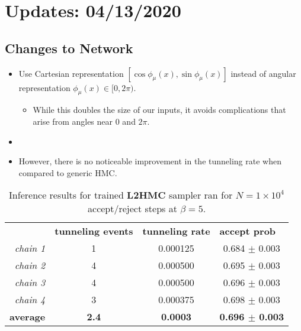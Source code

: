 \section{Updates: 04/13/2020}%
\label{sec:updates_2020_04_13}
%
\subsection{Changes to Network}%
\label{subsec:changes_to_network}
%
\begin{itemize}
  \item Use Cartesian representation \(\left[{\cos\phi_\mu(x),
    \sin\phi_\mu(x)}\right]\) instead of angular representation \(\phi_{\mu}(x)
    \in [{0, 2\pi})\).
    \begin{itemize}
      \item While this doubles the size of our inputs, it avoids complications
        that arise from angles near \(0\) and \(2\pi\).
    \end{itemize}
  \item \color{blue}{Under this new representation, the bias in the average
    plaquette no longer seems to be an issue.}\color{black}
  \item However, there is no noticeable improvement in the tunneling rate when
    compared to generic HMC.\@
  \color{black}
\end{itemize}
%
\begin{table}[ht!]
  \centering
  \begin{tabular}{@{}rccc@{}}
  \multicolumn{1}{l}{} & \multicolumn{1}{l}{\textbf{tunneling events}} & \multicolumn{1}{l}{\textbf{tunneling rate}} & \multicolumn{1}{l}{\textbf{accept prob}} \\
  \cmidrule(l){1-4} 
   \multicolumn{1}{r}{\textit{chain 1}} & 1 & 0.000125 & 0.684 \(\pm\) 0.003 \\
   \multicolumn{1}{r}{\textit{chain 2}} & 4 & 0.000500 & 0.695 \(\pm\) 0.003 \\
   \multicolumn{1}{r}{\textit{chain 3}} & 4 & 0.000500 & 0.696 \(\pm\) 0.003 \\
   \multicolumn{1}{r}{\textit{chain 4}} & 3 & 0.000375 & 0.698 \(\pm\) 0.003 \\
  \cmidrule(l){1-4}
   \multicolumn{1}{r}{\textbf{average}} & \textbf{2.4} & \textbf{0.0003} &
   \textbf{0.696 \(\pm\) 0.003}
  \end{tabular}
  \caption{Inference results for trained \textbf{L2HMC} sampler ran for \(N = 1\times
  10^{4}\) accept/reject steps at \(\beta = 5\).}%
  \label{tab:l2hmc_inference}
\end{table}
